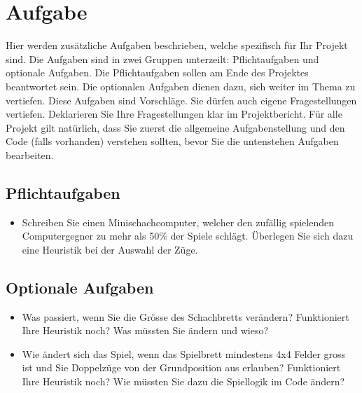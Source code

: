 \documentclass[a4paper,11pt,german,notitlepage]{report}
\begin{document}
\section*{Aufgabe}
Hier werden zusätzliche Aufgaben beschrieben, welche spezifisch für Ihr Projekt sind.
Die Aufgaben sind in zwei Gruppen unterzeilt: Pflichtaufgaben und optionale Aufgaben.
Die Pflichtaufgaben sollen am Ende des Projektes beantwortet sein.
Die optionalen Aufgaben dienen dazu, sich weiter im Thema zu vertiefen.
Diese Aufgaben sind Vorschläge. Sie dürfen auch eigene Fragestellungen vertiefen.
Deklarieren Sie Ihre Fragestellungen klar im Projektbericht.
Für alle Projekt gilt natürlich, dass Sie zuerst die allgemeine Aufgabenstellung und den Code (falls vorhanden) verstehen sollten, bevor Sie die untenstehen Aufgaben bearbeiten.
\subsection*{Pflichtaufgaben}
\begin{itemize}
    \item Schreiben Sie einen Minischachcomputer, welcher den zufällig spielenden Computergegner zu mehr als 50\% der Spiele schlägt. Überlegen Sie sich dazu eine Heuristik bei der Auswahl der Züge.
\end{itemize}
\subsection*{Optionale Aufgaben}
\begin{itemize}
    \item Was passiert, wenn Sie die Grösse des Schachbretts verändern? Funktioniert Ihre Heuristik noch? Was müssten Sie ändern und wieso?
    \item Wie ändert sich das Spiel, wenn das Spielbrett mindestens 4x4 Felder gross ist und Sie Doppelzüge von der Grundposition aus erlauben? Funktioniert Ihre Heuristik noch? Wie müssten Sie dazu die Spiellogik im Code ändern?
\end{itemize}
\end{document}
